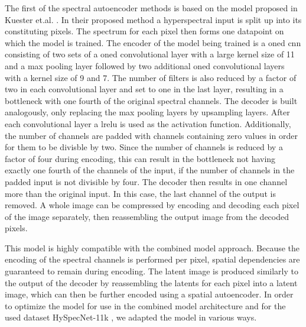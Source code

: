 The first of the spectral autoencoder methods is based on the model proposed in Kuester et.al. \citep{kuester_1d-convolutional_2021,kuester_transferability_2022}. In their proposed method a hyperspectral input is split up into its constituting pixels. The spectrum for each pixel then forms one datapoint on which the model is trained. The encoder of the model being trained is a \ac{oned} \ac{cnn} consisting of two sets of a \ac{oned} convolutional layer with a large kernel size of 11 and a max pooling layer followed by two additional \ac{oned} convolutional layers with a kernel size of 9 and 7. The number of filters is also reduced by a factor of two in each convolutional layer and set to one in the last layer, resulting in a bottleneck with one fourth of the original spectral channels. The decoder is built analogously, only replacing the max pooling layers by upsampling layers. After each convolutional layer a \ac{lrelu} is used as the activation function. Additionally, the number of channels are padded with channels containing zero values in order for them to be divisble by two. Since the number of channels is reduced by a factor of four during encoding, this can result in the bottleneck not having exactly one fourth of the channels of the input, if the number of channels in the padded input is not divisible by four. The decoder then results in one channel more than the original input. In this case, the last channel of the output is removed. A whole image can be compressed by encoding and decoding each pixel of the image separately, then reassembling the output image from the decoded pixels.

This model is highly compatible with the combined model approach. Because the encoding of the spectral channels is performed per pixel, spatial dependencies are guaranteed to remain during encoding. The latent image is produced similarly to the output of the decoder by reassembling the latents for each pixel into a latent image, which can then be further encoded using a spatial autoencoder. In order to optimize the model for use in the combined model architecture and for the used dataset HySpecNet-11k \citep{fuchs_hyspecnet-11k_2023}, we adapted the model in various ways.


